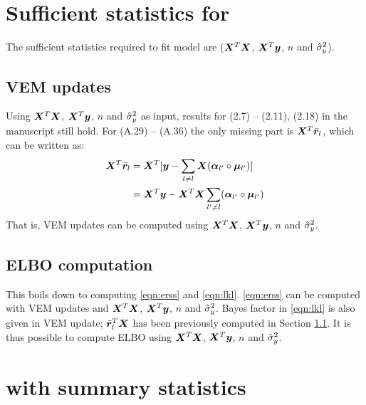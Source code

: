 \section{Sufficient statistics for \susie}

The sufficient statistics required to fit \susie model are ($\bm X^T\bm X$, $\bm X^T\bm y$, $n$ and $\hat{\sigma}_y^2$).

\subsection{VEM updates} \label{sec:vem_update_ss}
Using $\bm X^T\bm X$, $\bm X^T\bm y$, $n$ and $\hat{\sigma}_y^2$ as input, results for (2.7) -- (2.11), (2.18) in the manuscript still hold. For (A.29) -- (A.36) the only missing part is $\bm X^T\bar{\bm r}_l$, which can be written as:
\begin{align}
\bm X^T\bar{\bm r}_l &= \bm X^T[\bm y - \sum_{l\neq l}\bm X (\bm \alpha_{l'} \circ \bm \mu_{l'})] \\
&= \bm X^T\bm y - \bm X^T\bm X\sum_{l'\neq l}(\bm \alpha_{l'} \circ \bm \mu_{l'})
\end{align}
That is, VEM updates can be computed using $\bm X^T\bm X$, $\bm X^T\bm y$, $n$ and $\hat{\sigma}_y^2$.

\subsection{ELBO computation} \label{sec:elbo_ss}
This boils down to computing \eqref{eqn:erss} and \eqref{eqn:lkl}. \eqref{eqn:erss} can be computed with VEM updates and $\bm X^T\bm X$, $\bm X^T\bm y$, $n$ and $\hat{\sigma}_y^2$. Bayes factor in \eqref{eqn:lkl} is also given in VEM update; $\bar{\bm r}_l^T\bm X$ has been previously computed in Section \ref{sec:vem_update_ss}. It is thus possible to compute ELBO using $\bm X^T\bm X$, $\bm X^T\bm y$, $n$ and $\hat{\sigma}_y^2$.

\section{\susie with summary statistics}

